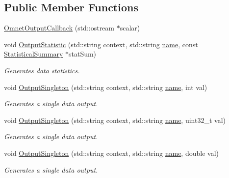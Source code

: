 \subsection*{Public Member Functions}
\begin{DoxyCompactItemize}
\item 
\hyperlink{classns3_1_1OmnetDataOutput_1_1OmnetOutputCallback_a052d17760dc8c8a112ac0caa63b13ced}{Omnet\+Output\+Callback} (std\+::ostream $\ast$scalar)
\item 
void \hyperlink{classns3_1_1OmnetDataOutput_1_1OmnetOutputCallback_acbf4fdc31e86c842597b1379358f675c}{Output\+Statistic} (std\+::string context, std\+::string \hyperlink{generate__test__data__lte__spectrum__model_8m_ab74e6bf80237ddc4109968cedc58c151}{name}, const \hyperlink{classns3_1_1StatisticalSummary}{Statistical\+Summary} $\ast$stat\+Sum)
\begin{DoxyCompactList}\small\item\em Generates data statistics. \end{DoxyCompactList}\item 
void \hyperlink{classns3_1_1OmnetDataOutput_1_1OmnetOutputCallback_acdc586cd9ff2229d9a52432745f4704f}{Output\+Singleton} (std\+::string context, std\+::string \hyperlink{generate__test__data__lte__spectrum__model_8m_ab74e6bf80237ddc4109968cedc58c151}{name}, int val)
\begin{DoxyCompactList}\small\item\em Generates a single data output. \end{DoxyCompactList}\item 
void \hyperlink{classns3_1_1OmnetDataOutput_1_1OmnetOutputCallback_a6bbfad04686067b2997f7841ecdbc99d}{Output\+Singleton} (std\+::string context, std\+::string \hyperlink{generate__test__data__lte__spectrum__model_8m_ab74e6bf80237ddc4109968cedc58c151}{name}, uint32\+\_\+t val)
\begin{DoxyCompactList}\small\item\em Generates a single data output. \end{DoxyCompactList}\item 
void \hyperlink{classns3_1_1OmnetDataOutput_1_1OmnetOutputCallback_a2f64171c895171e0548de6c60f73fab0}{Output\+Singleton} (std\+::string context, std\+::string \hyperlink{generate__test__data__lte__spectrum__model_8m_ab74e6bf80237ddc4109968cedc58c151}{name}, double val)
\begin{DoxyCompactList}\small\item\em Generates a single data output. \end{DoxyCompactList}\item 

\end{DoxyCompactItemize}
